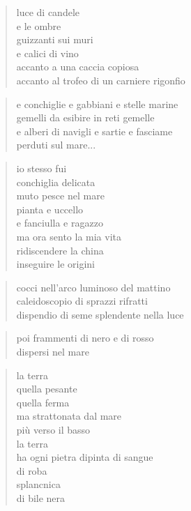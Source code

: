 	\begin{verse}
		luce di candele\\
		e le ombre\\
		guizzanti sui muri\\
		e calici di vino\\
		accanto a una caccia copiosa\\
		accanto al trofeo di un carniere rigonfio
	\end{verse}

	\begin{verse}
		e conchiglie e gabbiani e stelle marine\\
		gemelli da esibire in reti gemelle\\
		e alberi di navigli e sartie e fasciame\\
		perduti sul mare...
	\end{verse}

	\begin{verse}
		io stesso fui\\
		conchiglia delicata\\
		muto pesce nel mare\\
		pianta e uccello\\
		e fanciulla e ragazzo\\
		ma ora sento la mia vita\\
		ridiscendere la china\\
		inseguire le origini
	\end{verse}

\clearpage


\vspace*{2cm}

	\begin{verse}
		cocci nell’arco luminoso del mattino\\
		caleidoscopio di sprazzi rifratti\\
		dispendio di seme splendente nella luce
	\end{verse}

	\begin{verse}
		poi frammenti di nero e di rosso\\
		dispersi nel mare
	\end{verse}

	\begin{verse}
		la terra\\
		quella pesante\\
		quella ferma\\
		ma strattonata dal mare\\
		più verso il basso\\
		la terra\\
		ha ogni pietra dipinta di sangue\\
		di roba\\
		splancnica\\
		di bile nera
	\end{verse}

